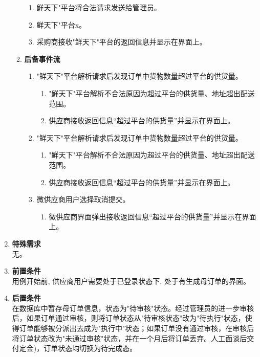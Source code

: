 \begin{enumerate}
\begin{enumerate}
\begin{enumerate}
            \item 鲜天下"平台将合法请求发送给管理员。
            
            \item 鲜天下"平台x。

            \item 采购商接收"鲜天下"平台的返回信息并显示在界面上。

        \end{enumerate}
        \item \textbf{后备事件流}
        \begin{enumerate}
            \item "鲜天下"平台解析请求后发现订单中货物数量超过平台的供货量。
            \begin{enumerate}
                \item "鲜天下"平台解析不合法原因为超过平台的供货量、地址超出配送范围。
                \item 供应商接收返回信息“超过平台的供货量”并显示在界面上。
            \end{enumerate}

            \item "鲜天下"平台解析请求后发现订单中货物数量超过平台的供货量。
            \begin{enumerate}
                \item "鲜天下"平台解析不合法原因为超过平台的供货量、地址超出配送范围。
                \item 供应商接收返回信息“超过平台的供货量”并显示在界面上。
            \end{enumerate}

            \item 微供应商用户选择取消提交。
            \begin{enumerate}
                \item 微供应商界面弹出接收返回信息“超过平台的供货量”并显示在界面上。
            \end{enumerate}

        \end{enumerate}
    \end{enumerate}
    \item \textbf{特殊需求} \\ 无。
    \item \textbf{前置条件} \\ 用例开始前, 供应商用户需要处于已登录状态下, 处于有生成母订单的界面。
    \item \textbf{后置条件} \\ 在数据库中暂存母订单信息，状态为"待审核"状态。经过管理员的进一步审核后，如果订单通过审核，则将订单状态从"待审核状态"改为"待执行"状态，使得订单能够被分派出去成为"执行中"状态；如果订单没有通过审核，在审核后将订单状态改为"未通过审核"状态，并在一个月后将订单丢弃。人工面谈后交付定金)，订单状态均切换为待完成态。
\end{enumerate}


